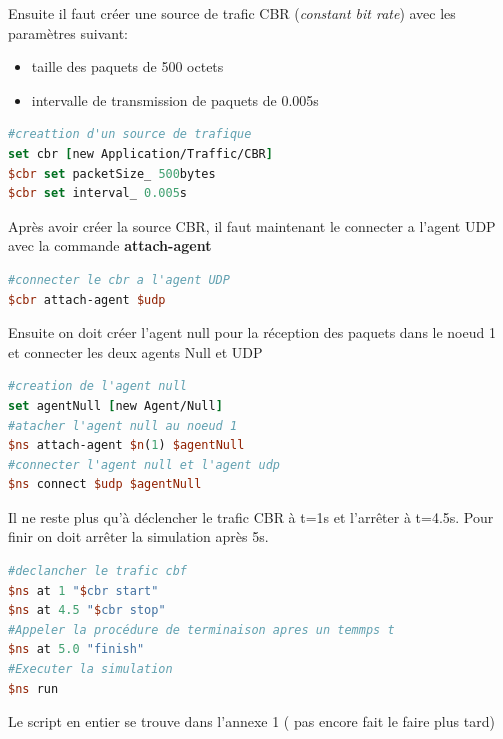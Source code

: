 \documentclass[11pt]{article}
\begin{document}
Ensuite il faut créer une source de trafic CBR (\textit{constant bit rate}) avec les paramètres suivant:
\begin{itemize}
	\item taille des paquets de 500 octets
	\item intervalle de transmission de paquets de 0.005s
\end{itemize}

\begin{lstlisting}[language=tcl, numbers=none, framexleftmargin=0pt, 	framextopmargin=0pt, framexbottommargin=0pt]
#creattion d'un source de trafique
set cbr [new Application/Traffic/CBR]
$cbr set packetSize_ 500bytes
$cbr set interval_ 0.005s
\end{lstlisting}

\noindent
Après avoir créer la source CBR, il faut maintenant le connecter a l'agent UDP avec la commande \textbf{attach-agent}
\begin{lstlisting}[language=tcl, numbers=none, framexleftmargin=0pt, 	framextopmargin=0pt, framexbottommargin=0pt]
#connecter le cbr a l'agent UDP
$cbr attach-agent $udp
\end{lstlisting}

\noindent

Ensuite on doit créer l'agent null pour la réception des paquets dans le noeud 1 et connecter les deux agents Null et UDP
\begin{lstlisting}[language=tcl, numbers=none, framexleftmargin=0pt, 	framextopmargin=0pt, framexbottommargin=0pt]
#creation de l'agent null
set agentNull [new Agent/Null]
#atacher l'agent null au noeud 1
$ns attach-agent $n(1) $agentNull 
#connecter l'agent null et l'agent udp
$ns connect $udp $agentNull 
\end{lstlisting}

Il ne reste plus qu'à déclencher le trafic CBR à t=1s et l’arrêter à t=4.5s. Pour finir on doit arrêter la simulation après 5s. 
\begin{lstlisting}[language=tcl, numbers=none, framexleftmargin=0pt, 	framextopmargin=0pt, framexbottommargin=0pt]
#declancher le trafic cbf
$ns at 1 "$cbr start"
$ns at 4.5 "$cbr stop"
#Appeler la procédure de terminaison apres un temmps t 
$ns at 5.0 "finish"
#Executer la simulation
$ns run
\end{lstlisting}



\noindent
Le script en entier se trouve dans l'annexe 1 ( pas encore fait le faire plus tard)
\end{document}
